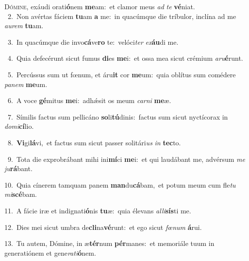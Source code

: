 \lettrine{\initial\textcolor{\initialcolor}{D}}{ómine,} exáudi orati\-\textbf{ó}\-nem \textbf{me}\-am:~\star et clamor meus \textit{ad} \textit{te} \textbf{vé}\-niat.\\
{\numbfont\textcolor{\numbcolor}{~2.}}~Non avértas fáciem \textbf{tu}\-am \textbf{a} me:~\star in quacúmque die tríbulor, inclína ad me \textit{au}\-\textit{rem} \textbf{tu}\-am.\par
{\numbfont\textcolor{\numbcolor}{~3.}}~In quacúmque die invo\-\textbf{cá}\-ve\textbf{ro} te:~\star velóci\textit{ter} \textit{ex}\-\textbf{áu}di me.\par
{\numbfont\textcolor{\numbcolor}{~4.}}~Quia defecérunt sicut fumus \textbf{di}\-es \textbf{me}\-i:~\star et ossa mea sicut crémium \textit{a}\-\textit{ru}\textbf{é}runt.\par
{\numbfont\textcolor{\numbcolor}{~5.}}~Percússus sum ut fœnum, et áru\textbf{it} cor \textbf{me}\-um:~\star quia oblítus sum comédere \textit{pa}\-\textit{nem} \textbf{me}\-um.\par
{\numbfont\textcolor{\numbcolor}{~6.}}~A voce \textbf{gé}\-mitus \textbf{me}\-i:~\star adhǽsit os meum \textit{car}\-\textit{ni} \textbf{me}\-æ.\par
{\numbfont\textcolor{\numbcolor}{~7.}}~Símilis factus sum pellicáno \textbf{so}\-li\-\textbf{tú}\-dinis:~\star factus sum sicut nyctícorax in \textit{do}\-\textit{mi}\textbf{cí}lio.\par
{\numbfont\textcolor{\numbcolor}{~8.}}~\-\textbf{Vi}\-gi\-\textbf{lá}\-vi,~\star et factus sum sicut passer solitári\textit{us} \textit{in} \textbf{tec}\-to.\par
{\numbfont\textcolor{\numbcolor}{~9.}}~Tota die exprobrábant mihi ini\-\textbf{mí}\-ci \textbf{me}\-i:~\star et qui laudábant me, advérsum \textit{me} \textit{ju}\-\textbf{rá}bant.\par
{\numbfont\textcolor{\numbcolor}{10.}}~Quia cínerem tamquam panem \textbf{man}\-du\-\textbf{cá}\-bam,~\star et potum meum cum fle\textit{tu} \textit{mi}\-\textbf{scé}bam.\par
{\numbfont\textcolor{\numbcolor}{11.}}~A fácie iræ et indignati\-\textbf{ó}\-nis \textbf{tu}\-æ:~\star quia élevans \textit{al}\-\textit{li}\textbf{sís}ti me.\par
{\numbfont\textcolor{\numbcolor}{12.}}~Dies mei sicut umbra de\-\textbf{cli}\-na\-\textbf{vé}\-runt:~\star et ego sicut \textit{fœ}\-\textit{num} \textbf{á}\-rui.\par
{\numbfont\textcolor{\numbcolor}{13.}}~Tu autem, Dómine, in æ\-\textbf{tér}\-num \textbf{pér}\-manes:~\star et memoriále tuum in generatiónem et gene\-\textit{ra}\-\textit{ti}\textbf{ó}nem.\par
